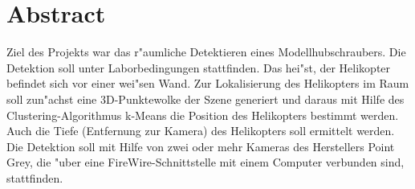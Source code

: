 \chapter*{Abstract}
Ziel des Projekts war das r"aumliche Detektieren eines Modellhubschraubers. Die Detektion soll unter Laborbedingungen stattfinden. Das hei"st, der Helikopter befindet sich vor einer wei"sen Wand.
Zur Lokalisierung des Helikopters im Raum soll zun"achst eine 3D-Punktewolke der Szene generiert und daraus mit Hilfe des Clustering-Algorithmus k-Means die Position des Helikopters bestimmt werden. Auch die Tiefe (Entfernung zur Kamera) des Helikopters soll ermittelt werden. Die Detektion soll mit Hilfe von zwei oder mehr Kameras des Herstellers Point Grey, die "uber eine FireWire-Schnittstelle mit einem Computer verbunden sind, stattfinden.